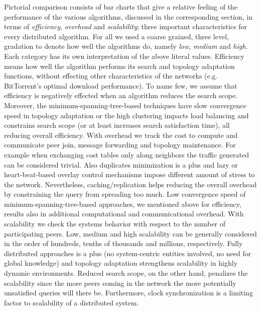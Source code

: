 Pictorial comparison consists of bar charts that give a relative feeling of the
performance of the various algorithms, discussed in the corresponding section,
in
terms of \emph{efficiency}, \emph{overhead} and \emph{scalability}; three
important characteristics for every distributed algorithm. For all we used a
coarse grained, three level, gradation to denote how well the algorithms do,
namely \emph{low}, \emph{medium} and \emph{high}. Each category has its own
interpretation of the above literal values. Efficiency means how well the
algorithm performs its search and topology adaptation functions, without
effecting other characteristics of the networks (e.g. BitTorrent's optimal
download performance). To name few, we assume that efficiency is
negatively effected when an algorithm reduces the search scope. Moreover, the
minimum-spanning-tree-based techniques have slow convergence speed in topology
adaptation or the high clustering impacts load balancing and constrains search
scope (or at least increases search satisfaction time), all reducing overall
efficiency. With overhead we track the cost to compute and communicate peer
join, message forwarding and topology maintenance. For example when exchanging
cost tables only along neighbors the traffic generated can be considered
trivial. Also duplicates minimization is a plus and lazy or heart-beat-based
overlay control mechanisms impose different amount of stress to the network.
Nevertheless, caching/replication helps reducing the overall overhead by
constraining the query from spreading too much. Low convergence speed of
minimum-spanning-tree-based approaches, we mentioned above for efficiency,
results also in additional computational and communicational overhead.
With scalability we check the systems behavior with respect to the number of
participating peers. Low, medium and high scalability can be generally
considered in the order of hundreds, tenths of thousands and millions,
respectively. Fully distributed approaches is a plus (no system-centric entities
involved, no need for global knowledge) and topology adaptation strengthens
scalability in highly dynamic environments. Reduced search scope, on the other
hand, penalizes the scalability since the more peers coming in the network the
more potentially unsatisfied queries will there be. Furthermore, clock
synchronization is a limiting factor to scalability of a distributed system.

%
%
%

